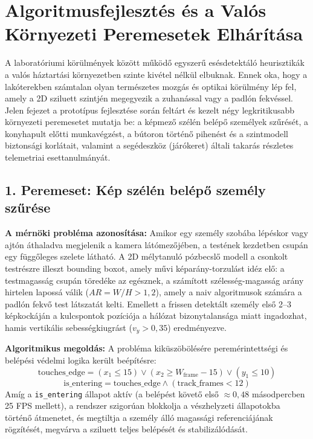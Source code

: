 \documentclass[12pt,a4paper,oneside]{report}
\begin{document}
\chapter{Algoritmusfejlesztés és a Valós Környezeti Peremesetek Elhárítása}

A laboratóriumi körülmények között működő egyszerű esésdetektáló heurisztikák a valós háztartási környezetben szinte kivétel nélkül elbuknak. Ennek oka, hogy a lakóterekben számtalan olyan természetes mozgás és optikai körülmény lép fel, amely a 2D sziluett szintjén megegyezik a zuhanással vagy a padlón fekvéssel. Jelen fejezet a prototípus fejlesztése során feltárt és kezelt négy legkritikusabb környezeti peremesetet mutatja be: a képmező szélén belépő személyek szűrését, a konyhapult előtti munkavégzést, a bútoron történő pihenést és a szintmodell biztonsági korlátait, valamint a segédeszköz (járókeret) általi takarás részletes telemetriai esettanulmányát.

\section{1. Peremeset: Kép szélén belépő személy szűrése}
\textbf{A mérnöki probléma azonosítása:} Amikor egy személy szobába lépéskor vagy ajtón áthaladva megjelenik a kamera látómezőjében, a testének kezdetben csupán egy függőleges szelete látható. A 2D mélytanuló pózbecslő modell a csonkolt testrészre illeszt bounding boxot, amely művi képarány-torzulást idéz elő: a testmagasság csupán töredéke az egésznek, a számított szélesség-magasság arány hirtelen lapossá válik ($AR = W/H > 1{,}2$), amely a naiv algoritmusok számára a padlón fekvő test látszatát kelti. Emellett a frissen detektált személy első 2--3 képkockáján a kulcspontok pozíciója a hálózat bizonytalansága miatt ingadozhat, hamis vertikális sebességkiugrást ($v_y > 0{,}35$) eredményezve.

\textbf{Algoritmikus megoldás:} A probléma kiküszöbölésére peremérintettségi és belépési védelmi logika került beépítésre:
\begin{equation}
    \text{touches\_edge} = (x_1 \le 15) \lor (x_2 \ge W_{\text{frame}} - 15) \lor (y_1 \le 10)
\end{equation}
\begin{equation}
    \text{is\_entering} = \text{touches\_edge} \land (\text{track\_frames} < 12)
\end{equation}
Amíg a \texttt{is\_entering} állapot aktív (a belépést követő első $\approx 0{,}48$ másodpercben 25 FPS mellett), a rendszer szigorúan blokkolja a vészhelyzeti állapotokba történő átmenetet, és megtiltja a személy álló magassági referenciájának rögzítését, megvárva a sziluett teljes belépését és stabilizálódását.
\end{document}
